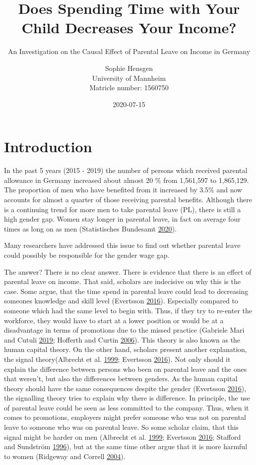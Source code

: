 \documentclass[
  12pt,
]{article}
\title{\vspace{1cm}Does Spending Time with Your Child Decreases Your Income?\vspace{0.5cm}\\}
\subtitle{An Investigation on the Causal Effect of Parental Leave on Income in Germany \vspace{0.5cm}}
\author{Sophie Hensgen\\
University of Mannheim\\
Matricle number: 1560750}
\date{2020-07-15\\}
\begin{document}
\maketitle

\hypertarget{introduction}{%
\section{Introduction}\label{introduction}}

In the past 5 years (2015 - 2019) the number of persons which received parental allowance in Germany increased about almost 20 \% from 1,561,597 to 1,865,129. The proportion of men who have benefited from it increased by 3.5\% and now accounts for almost a quarter of those receiving parental benefits. Although there is a continuing trend for more men to take parental leave (PL), there is still a high gender gap. Women stay longer in parental leave, in fact on average four times as long on as men (Statistisches Bundesamt \protect\hyperlink{ref-statistisches_bundesamt_zeitreihe_2020}{2020}).

Many researchers have addressed this issue to find out whether parental leave could possibly be responsible for the gender wage gap.

The answer? There is no clear answer.
There is evidence that there is an effect of parental leave on income. That said, scholars are indecisive on why this is the case. Some argue, that the time spend in parental leave could lead to decreasing someones knowledge and skill level (Evertsson \protect\hyperlink{ref-evertsson_parental_2016}{2016}). Especially compared to someone which had the same level to begin with. Thus, if they try to re-enter the workforce, they would have to start at a lower position or would be at a disadvantage in terms of promotions due to the missed practice (Gabriele Mari and Cutuli \protect\hyperlink{ref-gabriele_mari_parental_2019}{2019}; Hofferth and Curtin \protect\hyperlink{ref-hofferth_parental_2006}{2006}). This theory is also known as the human capital theory. On the other hand, scholars present another explanation, the signal theory(Albrecht et al. \protect\hyperlink{ref-albrecht_career_1999}{1999}; Evertsson \protect\hyperlink{ref-evertsson_parental_2016}{2016}).
Not only should it explain the difference between persons who been on parental leave and the ones that weren't, but also the differences between genders. As the human capital theory should have the same consequences despite the gender (Evertsson \protect\hyperlink{ref-evertsson_parental_2016}{2016}), the signalling theory tries to explain why there is difference. In principle, the use of parental leave could be seen as less committed to the company. Thus, when it comes to promotions, employers might prefer someone who was not on parental leave to someone who was on parental leave. So some scholar claim, that this signal might be harder on men (Albrecht et al. \protect\hyperlink{ref-albrecht_career_1999}{1999}; Evertsson \protect\hyperlink{ref-evertsson_parental_2016}{2016}; Stafford and Sundström \protect\hyperlink{ref-stafford_time_1996}{1996}), but at the same time other argue that it is more harmful to women (Ridgeway and Correll \protect\hyperlink{ref-ridgeway_unpacking_2004}{2004}).
\end{document}

